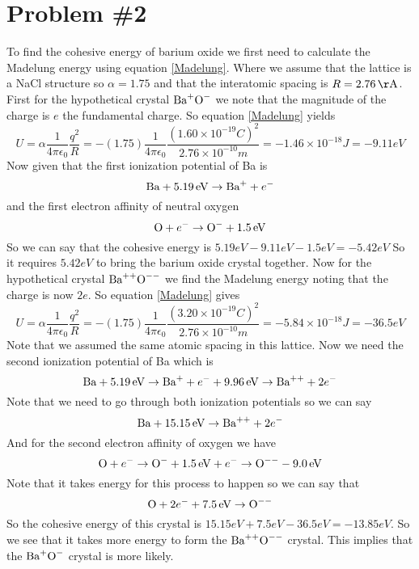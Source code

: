 \documentclass[11pt]{article}
\numberwithin{equation}{section}
\begin{document}
\section{Problem \#2}
To find the cohesive energy of barium oxide we first need to calculate the Madelung energy using equation \ref{Madelung}. Where we assume that the lattice is a NaCl structure so $\alpha=1.75$ and that the interatomic spacing is $R = 2.76\unit{\AA}$. First for the hypothetical crystal $\textnormal{Ba}^{+}\textnormal{O}^{-}$ we note that the magnitude of the charge is $e$ the fundamental charge. So equation \ref{Madelung} yields
$$U =  \alpha\frac{1}{4\pi\epsilon_0}\frac{q^2}{R} = -(1.75)\frac{1}{4\pi\epsilon_0}\frac{(1.60\times10^{-19}\unit{C})^2}{2.76\times10^{-10}\unit{m}} = -1.46\times10^{-18}\unit{J} = -9.11\unit{eV}$$
Now given that the first ionization potential of Ba is
$$\textnormal{Ba}+5.19\, \mathrm{eV}\rightarrow \textnormal{Ba}^{+}+e^{-}$$
and the first electron affinity of neutral oxygen 
$$\textnormal{O}+e^{-}\rightarrow \textnormal{O}^{-}+1.5\, \mathrm{eV}$$
So we can say that the cohesive energy is $5.19\unit{eV}-9.11\unit{eV}-1.5\unit{eV} = -5.42\unit{eV}$
So it requires $5.42\unit{eV}$ to bring the barium oxide crystal together. Now for the hypothetical crystal $\textnormal{Ba}^{++}\textnormal{O}^{--}$ we find the Madelung energy noting that the charge is now $2e$. So equation \ref{Madelung} gives
$$U =  \alpha\frac{1}{4\pi\epsilon_0}\frac{q^2}{R} = -(1.75)\frac{1}{4\pi\epsilon_0}\frac{(3.20\times10^{-19}\unit{C})^2}{2.76\times10^{-10}\unit{m}} = -5.84\times10^{-18}\unit{J} = -36.5\unit{eV}$$
Note that we assumed the same atomic spacing in this lattice. Now we need the second ionization potential of Ba which is
$$\textnormal{Ba}+5.19\, \mathrm{eV}\rightarrow \textnormal{Ba}^{+}+e^{-}+9.96\, \mathrm{eV}\rightarrow \textnormal{Ba}^{++}+2e^{-}$$
Note that we need to go through both ionization potentials so we can say
$$\textnormal{Ba}+15.15\, \mathrm{eV}\rightarrow \textnormal{Ba}^{++}+2e^{-}$$
And for the second electron affinity of oxygen we have
$$\textnormal{O}+e^{-}\rightarrow \textnormal{O}^{-}+1.5\, \mathrm{eV}+e^{-}\rightarrow\textnormal{O}^{--}-9.0\, \mathrm{eV}$$
Note that it takes energy for this process to happen so we can say that
$$\textnormal{O}+2e^{-}+7.5\, \mathrm{eV}\rightarrow \textnormal{O}^{--}$$
So the cohesive energy of this crystal is $15.15\unit{eV}+7.5\unit{eV}-36.5\unit{eV} = -13.85\unit{eV}$. So we see that it takes more energy to form the $\textnormal{Ba}^{++}\textnormal{O}^{--}$ crystal. This implies that the $\textnormal{Ba}^{+}\textnormal{O}^{-}$ crystal is more likely.
\end{document}
